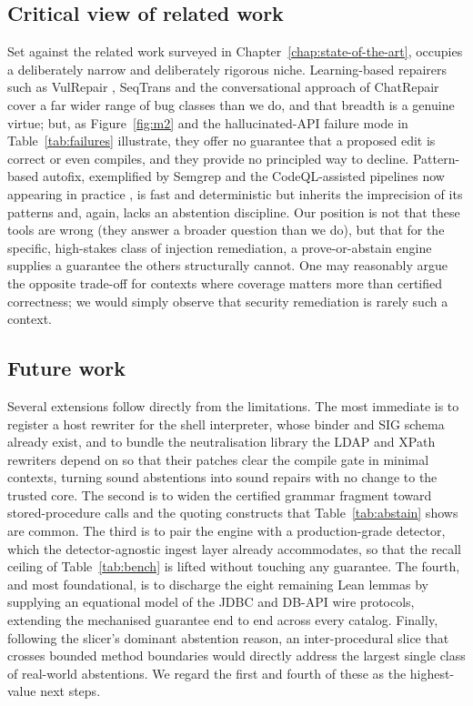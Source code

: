 \subsection{Critical view of related work}
\label{sec:disc-related}

Set against the related work surveyed in Chapter~\ref{chap:state-of-the-art}, \irsam{}
occupies a deliberately narrow and deliberately rigorous niche. Learning-based
repairers such as VulRepair \citep{fu2022vulrepair}, SeqTrans
\citep{chi2023seqtrans} and the conversational approach of ChatRepair
\citep{xia2023chatrepair} cover a far wider range of bug classes than we do,
and that breadth is a genuine virtue; but, as Figure~\ref{fig:m2} and the
hallucinated-API failure mode in Table~\ref{tab:failures} illustrate, they
offer no guarantee that a proposed edit is correct or even compiles, and they
provide no principled way to decline. Pattern-based autofix, exemplified by
Semgrep \citep{semgrep2024} and the CodeQL-assisted pipelines now appearing in
practice \citep{githubautofix2024}, is fast and deterministic but inherits the
imprecision of its patterns and, again, lacks an abstention discipline. Our
position is not that these tools are wrong (they answer a broader question
than we do), but that for the specific, high-stakes class of injection
remediation, a prove-or-abstain engine supplies a guarantee the others
structurally cannot. One may reasonably argue the opposite trade-off for
contexts where coverage matters more than certified correctness; we would
simply observe that security remediation is rarely such a context.

\subsection{Future work}
\label{sec:disc-future}

Several extensions follow directly from the limitations. The most immediate
is to register a host rewriter for the shell interpreter, whose binder and
SIG schema already exist, and to bundle the neutralisation library the LDAP
and XPath rewriters depend on so that their patches clear the compile gate in
minimal contexts, turning sound abstentions into sound repairs with no change
to the trusted core. The second is to widen
the certified grammar fragment toward stored-procedure calls and
the quoting constructs that Table~\ref{tab:abstain} shows are common. The
third is to pair the engine with a production-grade detector, which the
detector-agnostic ingest layer already accommodates, so that the recall
ceiling of Table~\ref{tab:bench} is lifted without touching any guarantee.
The fourth, and most foundational, is to discharge the eight remaining Lean
lemmas by supplying an equational model of the JDBC and DB-API wire protocols,
extending the mechanised guarantee end to end across every catalog. Finally,
following the slicer's dominant abstention reason, an inter-procedural slice
that crosses bounded method boundaries would directly address the largest
single class of real-world abstentions. We regard the first and fourth of
these as the highest-value next steps.


